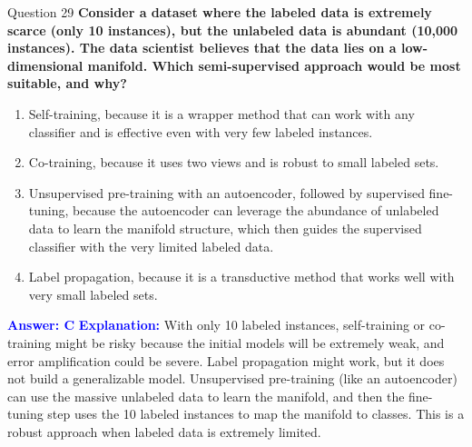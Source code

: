 \documentclass{beamer}
\begin{document}
	\begin{frame}{Question 29}
		\textbf{Consider a dataset where the labeled data is extremely scarce (only 10 instances), but the unlabeled data is abundant (10,000 instances). The data scientist believes that the data lies on a low-dimensional manifold. Which semi-supervised approach would be most suitable, and why?}
		\begin{enumerate}
			\item Self-training, because it is a wrapper method that can work with any classifier and is effective even with very few labeled instances.
			\item Co-training, because it uses two views and is robust to small labeled sets.
			\item Unsupervised pre-training with an autoencoder, followed by supervised fine-tuning, because the autoencoder can leverage the abundance of unlabeled data to learn the manifold structure, which then guides the supervised classifier with the very limited labeled data.
			\item Label propagation, because it is a transductive method that works well with very small labeled sets.
		\end{enumerate}
		\vspace{0.2cm}
		\textcolor{blue}{\textbf{Answer: C}}
		\vspace{0.2cm}
		\textcolor{blue}{\textbf{Explanation:}} With only 10 labeled instances, self-training or co-training might be risky because the initial models will be extremely weak, and error amplification could be severe. Label propagation might work, but it does not build a generalizable model. Unsupervised pre-training (like an autoencoder) can use the massive unlabeled data to learn the manifold, and then the fine-tuning step uses the 10 labeled instances to map the manifold to classes. This is a robust approach when labeled data is extremely limited.
	\end{frame}
	
\end{document}

